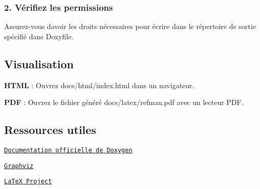 \subsubsection*{2. Vérifiez les permissions}

Assurez-\/vous d\textquotesingle{}avoir les droits nécessaires pour écrire dans le répertoire de sortie spécifié dans {\ttfamily Doxyfile}. 



\subsection*{Visualisation}


\begin{DoxyItemize}
\item {\bfseries H\+T\+ML} \+: Ouvrez {\ttfamily docs/html/index.\+html} dans un navigateur.
\item {\bfseries P\+DF} \+: Ouvrez le fichier généré {\ttfamily docs/latex/refman.\+pdf} avec un lecteur P\+DF. 


\end{DoxyItemize}

\subsection*{Ressources utiles}


\begin{DoxyItemize}
\item \href{https://www.doxygen.nl/manual/index.html}{\tt Documentation officielle de Doxygen}
\item \href{https://graphviz.org/}{\tt Graphviz}
\item \href{https://www.latex-project.org/}{\tt La\+TeX Project} 
\end{DoxyItemize}